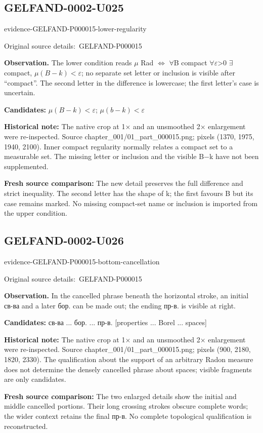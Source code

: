\documentclass[11pt]{article}
\newcommand{\EvidenceBlock}[4]{%
 \par\smallskip\noindent\begin{minipage}{\linewidth}
 \begin{minipage}[t]{.47\linewidth}\vspace{0pt}\centering
 \csname evidence-#1-#2\endcsname\par
 {\scriptsize\SourceCropCaption\ #1}\par
 \end{minipage}\hfill
 \begin{minipage}[t]{.49\linewidth}\vspace{0pt}\raggedright
 {\small\color{orange!65!black}\textbf{#4} #3}\par
 \end{minipage}
 \end{minipage}\par\smallskip}
\newcommand{\SourceCropCaption}{Original source details:}\newcommand{\ReadingCaption}{Uncertain reading.}\newcommand{\IncompleteCaption}{Undeciphered passage.}\newcommand{\DiagramCaption}{Diagram and typed description.}
\begin{document}
\subsection*{GELFAND-0002-U025}
\EvidenceBlock{GELFAND-P000015}{lower-regularity}{The lower condition reads \(\mu\) Rad \(\Longleftrightarrow\) \(\forall\)B compact \(\forall\)\(\varepsilon\)>0 \(\exists\)compact, \(\mu(B-k)<\varepsilon\); no separate set letter or inclusion is visible after “compact”. The second letter in the difference is lowercase; the first letter’s case is uncertain.}{Observation.}
\par\smallskip\noindent\textbf{Candidates: } \(\mu(B-k)<\varepsilon\); \(\mu(b-k)<\varepsilon\)\par
\par\smallskip\noindent\textbf{Historical note: } The native crop at 1× and an unsmoothed 2× enlargement were re-inspected. Source chapter\_001/01\_part\_000015.png; pixels (1370, 1975, 1940, 2100). Inner compact regularity normally relates a compact set to a measurable set. The missing letter or inclusion and the visible B−k have not been supplemented.\par
\par\smallskip\noindent\textbf{Fresh source comparison: } The new detail preserves the full difference and strict inequality. The second letter has the shape of k; the first favours B but its case remains marked. No missing compact-set name or inclusion is imported from the upper condition.\par

\subsection*{GELFAND-0002-U026}
\EvidenceBlock{GELFAND-P000015}{bottom-cancellation}{In the cancelled phrase beneath the horizontal stroke, an initial св-ва and a later бор. can be made out; the ending пр-в. is visible at right.}{Observation.}
\par\smallskip\noindent\textbf{Candidates: } св-ва ... бор. ... пр-в. [properties ... Borel ... spaces]\par
\par\smallskip\noindent\textbf{Historical note: } The native crop at 1× and an unsmoothed 2× enlargement were re-inspected. Source chapter\_001/01\_part\_000015.png; pixels (900, 2180, 1820, 2330). The qualification about the support of an arbitrary Radon measure does not determine the densely cancelled phrase about spaces; visible fragments are only candidates.\par
\par\smallskip\noindent\textbf{Fresh source comparison: } The two enlarged details show the initial and middle cancelled portions. Their long crossing strokes obscure complete words; the wider context retains the final пр-в. No complete topological qualification is reconstructed.\par
\end{document}

